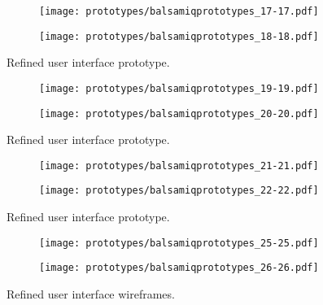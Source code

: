\documentclass{l4proj}
\begin{document}
\begin{appendices}
\begin{figure}[!ht]
    \centering
    \begin{subfigure}[b]{0.45\textwidth}
        \texttt{[image: prototypes/balsamiqprototypes\_17-17.pdf]}
        \label{fig:ref13}
    \end{subfigure}
    \begin{subfigure}[b]{0.45\textwidth}
        \texttt{[image: prototypes/balsamiqprototypes\_18-18.pdf]}
        \label{fig:ref14}
    \end{subfigure}   
    \caption{Refined user interface prototype.}
    \label{fig:prototypes8}
\end{figure}

\begin{figure}[!ht]
    \centering
    \begin{subfigure}[b]{0.45\textwidth}
        \texttt{[image: prototypes/balsamiqprototypes\_19-19.pdf]}
        \label{fig:ref15}
    \end{subfigure}
    \begin{subfigure}[b]{0.45\textwidth}
        \texttt{[image: prototypes/balsamiqprototypes\_20-20.pdf]}
        \label{fig:ref16}
    \end{subfigure}
    \caption{Refined user interface prototype.}
    \label{fig:prototypes9}
\end{figure}

\begin{figure}[!ht]
    \centering
    \begin{subfigure}[b]{0.45\textwidth}
        \texttt{[image: prototypes/balsamiqprototypes\_21-21.pdf]}
        \label{fig:ref17}
    \end{subfigure}
    \begin{subfigure}[b]{0.45\textwidth}
        \texttt{[image: prototypes/balsamiqprototypes\_22-22.pdf]}
        \label{fig:ref18}
    \end{subfigure}   
    \caption{Refined user interface prototype.}
    \label{fig:prototypes10}
\end{figure}


\begin{figure}[!ht]
    \centering
    \begin{subfigure}[b]{0.45\textwidth}
        \texttt{[image: prototypes/balsamiqprototypes\_25-25.pdf]}
        \label{fig:ref19}
    \end{subfigure}
    \begin{subfigure}[b]{0.45\textwidth}
        \texttt{[image: prototypes/balsamiqprototypes\_26-26.pdf]}
        \label{fig:ref20}
    \end{subfigure}
    \caption{Refined user interface wireframes.}
    \label{fig:prototypes11}
\end{figure}



\end{appendices}
\end{document}
